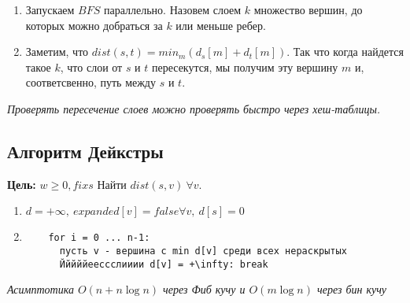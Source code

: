 \begin{enumerate}
  \item Запускаем $BFS$ параллельно. Назовем слоем $k$ множество вершин, до которых можно добраться за $k$ или меньше ребер.
  
  \item Заметим, что $dist(s, t) = min_m(d_s[m] + d_t[m])$. Так что когда найдется такое $k$, что слои от $s$ и $t$ пересекутся, мы получим эту вершину $m$ и, соответсвенно, путь между $s$ и $t$.
\end{enumerate}

\textit{Проверять пересечение слоев можно проверять быстро через хеш-таблицы.}

\subsection{Алгоритм Дейкстры}
\textbf{Цель: }$w \ge 0, fix s$ Найти $dist(s, v) \ \forall v$. 
\begin{enumerate}
  \item $d = +\infty, \ expanded[v] = false \forall v, \ d[s] = 0$
  \item \begin{verbatim}
    for i = 0 ... n-1:
      пусть v - вершина с min d[v] среди всех нераскрытых
      Йййййеессслииии d[v] = +\infty: break
  \end{verbatim}
\end{enumerate}
\textit{Асимптотика $O(n + n\log{n})$ через Фиб кучу и $O(m \log{n})$ через бин кучу}
